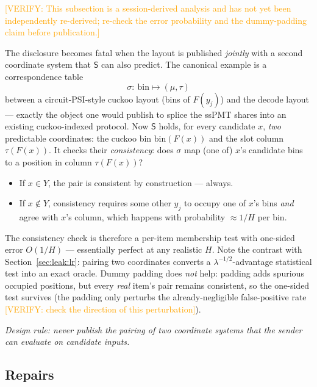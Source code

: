 \documentclass[runningheads]{llncs}
\newcommand{\VERIFY}[1]{\textcolor{orange}{[VERIFY: #1]}}
\newcommand{\Snd}{\mathsf{S}}                %
\newcommand{\half}{H}                        %
\begin{document}
\VERIFY{This subsection is a session-derived analysis and has not yet been
independently re-derived; re-check the error probability and the dummy-padding claim
before publication.}

The disclosure becomes fatal when the layout is published \emph{jointly} with a
second coordinate system that $\Snd$ can also predict. The canonical example is a
correspondence table
\[
  \sigma:\ \mathrm{bin}\longmapsto(\mu,\tau)
\]
between a circuit-PSI-style cuckoo layout (bins of $F(y_j)$) and the decode layout
--- exactly the object one would publish to splice the ssPMT shares into an existing
cuckoo-indexed protocol. Now $\Snd$ holds, for every candidate $x$, \emph{two}
predictable coordinates: the cuckoo bin $\mathrm{bin}(F(x))$ and the slot column
$\tau(F(x))$. It checks their \emph{consistency}: does $\sigma$ map (one of) $x$'s
candidate bins to a position in column $\tau(F(x))$?
\begin{itemize}
  \item If $x\in Y$, the pair is consistent by construction --- always.
  \item If $x\notin Y$, consistency requires some other $y_j$ to occupy one of
  $x$'s bins \emph{and} agree with $x$'s column, which happens with probability
  $\approx1/\half$ per bin.
\end{itemize}
The consistency check is therefore a per-item membership test with one-sided error
$O(1/\half)$ --- essentially perfect at any realistic $\half$. Note the contrast with
Section~\ref{sec:leak:lr}: pairing two coordinates converts a
$\lambda^{-1/2}$-advantage statistical test into an exact oracle. Dummy padding does
\emph{not} help: padding adds spurious occupied positions, but every \emph{real}
item's pair remains consistent, so the one-sided test survives (the padding only
perturbs the already-negligible false-positive rate \VERIFY{check the direction of
this perturbation}).

\begin{center}
\emph{Design rule: never publish the pairing of two coordinate systems that the
sender can evaluate on candidate inputs.}
\end{center}

\subsection{Repairs}
\label{sec:leak:repair}
\end{document}
